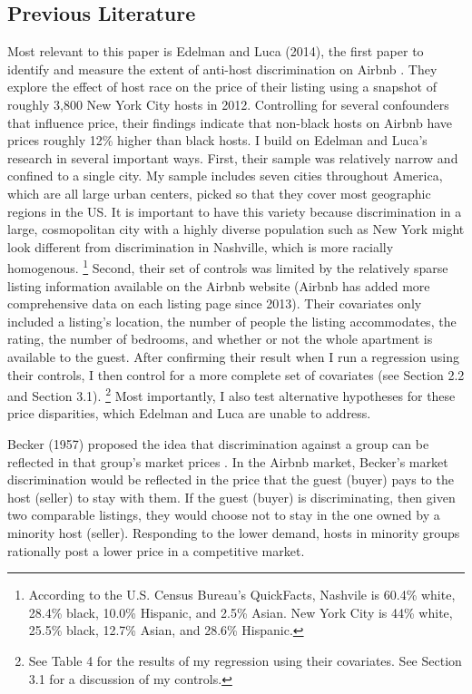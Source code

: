 \subsection{Previous Literature} 
Most relevant to this paper is Edelman and Luca (2014), the first paper to identify and measure the extent of anti-host discrimination on Airbnb \citep{edelman}. They explore the effect of host race on the price of their listing using a snapshot of roughly 3,800 New York City hosts in 2012. Controlling for several confounders that influence price, their findings indicate that non-black hosts on Airbnb have prices roughly 12\% higher than black hosts. I build on Edelman and Luca's research in several important ways. First, their sample was relatively narrow and confined to a single city. My sample includes seven cities throughout America, which are all large urban centers, picked so that they cover most geographic regions in the US. It is important to have this variety because discrimination in a large, cosmopolitan city with a highly diverse population such as New York might look different from discrimination in Nashville, which is more racially homogenous.%
	\footnote{According to the U.S. Census Bureau's QuickFacts, Nashvile is 60.4\% white, 28.4\% black, 10.0\% Hispanic, and 2.5\% Asian. New York City is 44\% white, 25.5\% black, 12.7\% Asian, and 28.6\% Hispanic.} 
Second, their set of controls was limited by the relatively sparse listing information available on the Airbnb website (Airbnb has added more comprehensive data on each listing page since 2013). Their covariates only included a listing's location, the number of people the listing accommodates, the rating, the number of bedrooms, and whether or not the whole apartment is available to the guest. After confirming their result when I run a regression using their controls, I then control for a more complete set of covariates (see Section 2.2 and Section 3.1).%
	\footnote{See Table 4 for the results of my regression using their covariates. See Section 3.1 for a discussion of my controls.} 
Most importantly, I also test alternative hypotheses for these price disparities, which Edelman and Luca are unable to address. 

Becker (1957) proposed the idea that discrimination against a group can be reflected in that group's market prices \citep{becker}. In the Airbnb market, Becker's market discrimination would be reflected in the price that the guest (buyer) pays to the host (seller) to stay with them. If the guest (buyer) is discriminating, then given two comparable listings, they would choose not to stay in the one owned by a minority host (seller). Responding to the lower demand, hosts in minority groups rationally post a lower price in a competitive market. 

